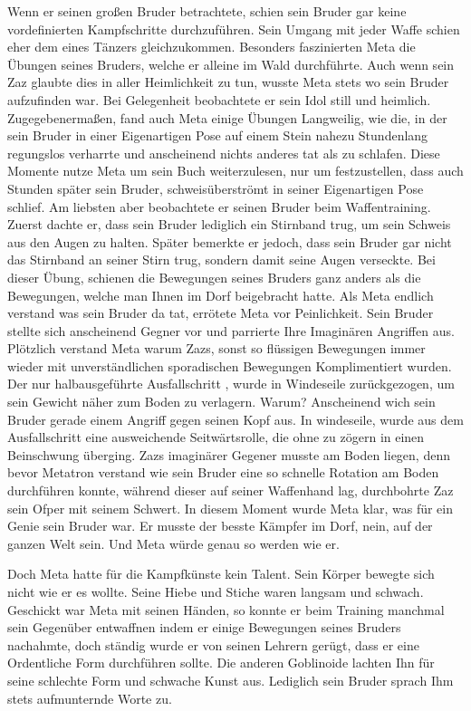 \documentclass[letterpaper,twocolumn,openany,nodeprecatedcode]{book}
\begin{document}
 Wenn er seinen großen Bruder betrachtete, schien sein Bruder gar keine vordefinierten Kampfschritte durchzuführen. Sein Umgang mit jeder Waffe schien eher dem eines Tänzers gleichzukommen. Besonders faszinierten Meta die Übungen seines Bruders, welche er alleine im Wald durchführte. Auch wenn sein Zaz glaubte dies in aller Heimlichkeit zu tun, wusste Meta stets wo sein Bruder aufzufinden war. Bei Gelegenheit beobachtete er sein Idol still und heimlich. Zugegebenermaßen, fand auch Meta einige Übungen Langweilig, wie die, in der sein Bruder in einer Eigenartigen Pose auf einem Stein nahezu Stundenlang regungslos verharrte und anscheinend nichts anderes tat als zu schlafen. Diese Momente nutze Meta um sein Buch weiterzulesen, nur um festzustellen, dass auch Stunden später sein Bruder, schweisüberströmt in seiner Eigenartigen Pose schlief. Am liebsten aber beobachtete er seinen Bruder beim Waffentraining. Zuerst dachte er, dass sein Bruder lediglich ein Stirnband trug, um sein Schweis aus den Augen zu halten. Später bemerkte er jedoch, dass sein Bruder gar nicht das Stirnband an seiner Stirn trug, sondern damit seine Augen verseckte. Bei dieser Übung, schienen die Bewegungen seines Bruders ganz anders als die Bewegungen, welche man Ihnen im Dorf beigebracht hatte. Als Meta endlich verstand was sein Bruder da tat, errötete Meta vor Peinlichkeit. Sein Bruder stellte sich anscheinend Gegner vor und parrierte Ihre Imaginären Angriffen aus. Plötzlich verstand Meta warum Zazs, sonst so flüssigen Bewegungen immer wieder mit unverständlichen sporadischen Bewegungen Komplimentiert wurden. Der nur halbausgeführte Ausfallschritt , wurde in Windeseile zurückgezogen, um sein Gewicht näher zum Boden zu verlagern. Warum? Anscheinend wich sein Bruder gerade einem Angriff gegen seinen Kopf aus. In windeseile, wurde aus dem Ausfallschritt eine ausweichende Seitwärtsrolle, die ohne zu zögern in einen Beinschwung überging. Zazs imaginärer Gegener musste am Boden liegen, denn bevor Metatron verstand wie sein Bruder eine so schnelle Rotation am Boden durchführen konnte, während dieser auf seiner Waffenhand lag, durchbohrte Zaz sein Ofper mit seinem Schwert. In diesem Moment wurde Meta klar, was für ein Genie sein Bruder war. Er musste der besste Kämpfer im Dorf, nein, auf der ganzen Welt sein. Und Meta würde genau so werden wie er.
 
 Doch Meta hatte für die Kampfkünste kein Talent. Sein Körper bewegte sich nicht wie er es wollte. Seine Hiebe und Stiche waren langsam und schwach. Geschickt war Meta mit seinen Händen, so konnte er beim Training manchmal sein Gegenüber entwaffnen indem er einige Bewegungen seines Bruders nachahmte, doch ständig wurde er von seinen Lehrern gerügt, dass er eine Ordentliche Form durchführen sollte. Die anderen Goblinoide lachten Ihn für seine schlechte Form und schwache Kunst aus. Lediglich sein Bruder sprach Ihm stets aufmunternde Worte zu.
\end{document}
